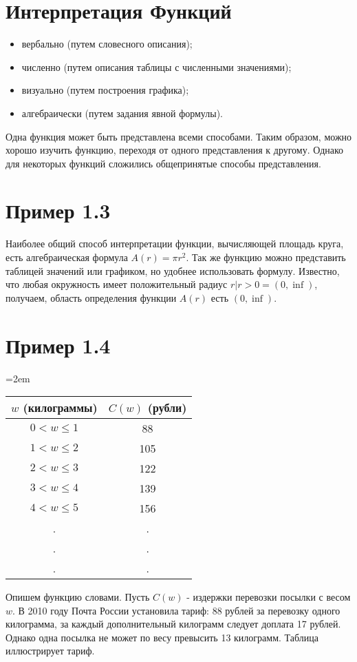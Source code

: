 \documentclass[a4paper,14pt]{report}
\begin{document}
\section*{ \colorbox{light-blue}{Интерпретация Функций}}
\begin{itemize}
	\item вербально (путем словесного описания);
	\item численно (путем описания таблицы с численными значениями);
	\item визуально (путем построения графика);
	\item алгебраически (путем задания явной формулы).
\end{itemize}

Одна функция может быть представлена всеми способами. Таким образом, можно хорошо изучить функцию, переходя от одного представления к другому. Однако для некоторых функций сложились общепринятые способы представления.

\section*{ Пример 1.3}
Наиболее общий способ интерпретации функции, вычисляющей площадь круга, есть алгебраическая формула $A(r) = \pi r^2$. Так же функцию можно представить таблицей значений или графиком, но удобнее использовать формулу. Известно, что любая окружность имеет положительный радиус ${r|r>0} = (0,\inf)$, получаем, область определения функции $A(r)$ есть $(0,\inf)$.
\section*{ Пример 1.4}
\noindent
\begin{minipage}[t]{70mm}\parindent=2em
    \begin{tabular}{|c|c|}
\hline
$w$ (килограммы) & $C(w)$ (рубли) \\
\hline
$0 < w \le 1$ &	88\\

$1 < w \le 2$ &	105 \\

$2 < w \le 3$ & 122 \\

$3 < w \le 4$	& 139\\

$4 < w \le 5$ & 156\\

. & . \\

. & . \\

. & . \\
\hline
\end{tabular}
\end{minipage}
\begin{minipage}[h]{80mm}
 Опишем функцию словами. Пусть $C(w)$ - издержки перевозки посылки с весом $w$. В 2010 году Почта России установила тариф: 88 рублей за перевозку одного килограмма, за каждый дополнительный килограмм следует доплата 17 рублей. Однако одна посылка не может по весу превысить 13 килограмм. Таблица иллюстрирует тариф.
\end{minipage}
 
\end{document}
